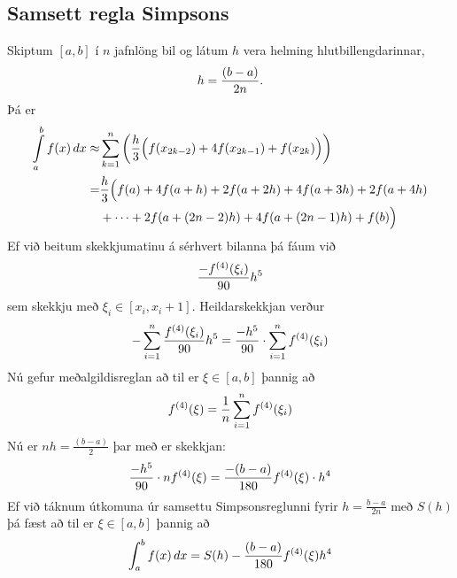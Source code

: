 \documentclass[letterpaper,10pt,icelandic]{sphinxmanual}
\begin{document}
\subsection{Samsett regla Simpsons}
\label{kafli05:id9}
Skiptum \([a,b]\) í \(n\) jafnlöng bil og látum \(h\) vera
helming hlutbillengdarinnar,
\begin{gather}
\begin{split}h = \frac{(b-a)}{2n}.\end{split}\notag
\end{gather}
Þá er
\begin{gather}
\begin{split}\begin{aligned}
  \int\limits_a^b f(x) \, dx
  \approx &
  \sum\limits_{k=1}^n
  \bigg(
    \frac{h}{3}
    \Big(
      f(x_{2k-2}) + 4f(x_{2k-1}) + f(x_{2k})
    \Big)
  \bigg) \\
  = &
  \frac{h}{3}
  \Big(
    f(a) + 4f(a+h) + 2f(a+2h)+ 4f(a+3h) + 2f(a+4h) \\
    &+ \cdots + 2f(a+(2n-2)h) + 4f(a+(2n-1)h) + f(b)
  \Big)\end{aligned}\end{split}\notag
\end{gather}
Ef við beitum skekkjumatinu á sérhvert bilanna þá fáum við
\begin{gather}
\begin{split}\frac{-f^{(4)}(\xi_i)}{90}h^5\end{split}\notag
\end{gather}
sem skekkju með \(\xi_i \in [x_i, x_i+1]\). Heildarskekkjan verður
\begin{gather}
\begin{split}-\sum_{i=1}^n \frac{f^{(4)}(\xi_i)}{90}h^5
  = \frac{-h^5}{90}\cdot \sum_{i=1}^n f^{(4)}(\xi_i)\end{split}\notag
\end{gather}
Nú gefur meðalgildisreglan að til er \(\xi \in [a,b]\) þannig að
\begin{gather}
\begin{split}f^{(4)}(\xi) = \frac{1}{n} \sum_{i=1}^n f^{(4)}(\xi_i)\end{split}\notag
\end{gather}
Nú er \(nh = \frac{(b-a)}{2}\) þar með er skekkjan:
\begin{gather}
\begin{split}\frac{-h^5}{90}\cdot nf^{(4)}(\xi)
  = \frac{-(b-a)}{180}f^{(4)}(\xi)\cdot h^4\end{split}\notag
\end{gather}
Ef við táknum útkomuna úr samsettu Simpsonsreglunni fyrir
\(h=\frac{b-a}{2n}\) með \(S(h)\) þá fæst að til er
\(\xi \in [a,b]\) þannig að
\begin{gather}
\begin{split}\int_a^b f(x)\,dx = S(h) - \frac{(b-a)}{180}f^{(4)}(\xi)h^4\end{split}\notag
\end{gather}
\end{document}
